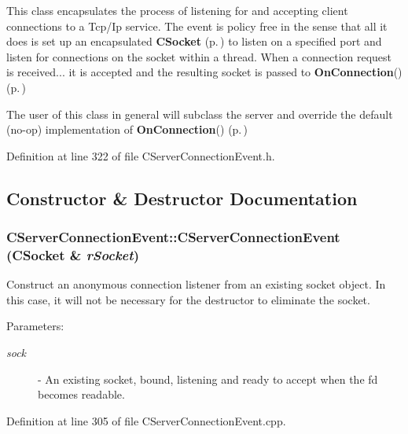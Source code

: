 This class encapsulates the process of listening for and accepting client connections to a Tcp/Ip service. The event is policy free in the sense that all it does is set up an encapsulated {\bf CSocket} {\rm (p.\,\pageref{classCSocket})} to listen on a specified port and listen for connections on the socket within a thread. When a connection request is received... it is accepted and the resulting socket is passed to {\bf On\-Connection}() {\rm (p.\,\pageref{classCServerConnectionEvent_a12})}

The user of this class in general will subclass the server and override the default (no-op) implementation of {\bf On\-Connection}() {\rm (p.\,\pageref{classCServerConnectionEvent_a12})} 



Definition at line 322 of file CServer\-Connection\-Event.h.

\subsection{Constructor \& Destructor Documentation}
\subsubsection{\setlength{\rightskip}{0pt plus 5cm}CServer\-Connection\-Event::CServer\-Connection\-Event ({\bf CSocket} \& {\em r\-Socket})}\label{classCServerConnectionEvent_a0}


Construct an anonymous connection listener from an existing socket object. In this case, it will not be necessary for the destructor to eliminate the socket.\begin{Desc}
\item[Parameters: ]\par
\begin{description}
\item[{\em 
sock}]- An existing socket, bound, listening and ready to accept when the fd becomes readable. \end{description}
\end{Desc}


Definition at line 305 of file CServer\-Connection\-Event.cpp.
